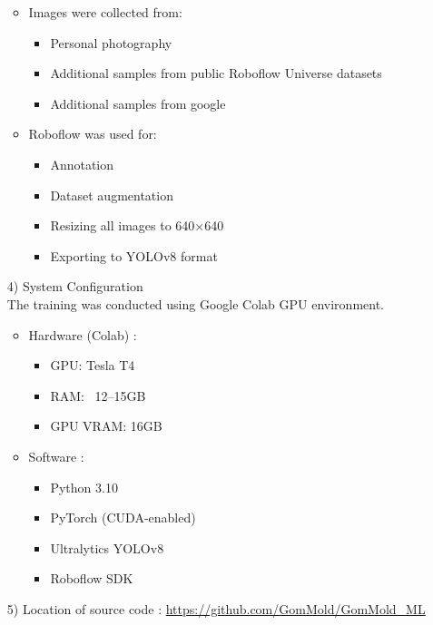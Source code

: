 \documentclass[conference]{IEEEtran}
\begin{document}
\begin{enumerate}
\begin{itemize}
        \item Images were collected from:
            \begin{itemize}
                \item Personal photography
                \item Additional samples from public Roboflow Universe datasets
                \item Additional samples from google 
            \end{itemize} 
            
         \item Roboflow was used for:
            \begin{itemize}
                \item Annotation
                \item Dataset augmentation
                \item Resizing all images to 640×640
                \item Exporting to YOLOv8 format\\
            \end{itemize} 
    \end{itemize}
    
\item[4)] System Configuration\\ 
\noindent The training was conducted using Google Colab GPU environment.
    \begin{itemize}
        \item Hardware (Colab) :
            \begin{itemize}
                \item GPU: Tesla T4 
                \item RAM: ~12–15GB
                \item GPU VRAM: 16GB
            \end{itemize}
            
        \item Software :
            \begin{itemize}
                \item Python 3.10
                \item PyTorch (CUDA-enabled)
                \item Ultralytics YOLOv8
                \item Roboflow SDK\\
            \end{itemize} 
    \end{itemize}

\item[5)]Location of source code : \url{https://github.com/GomMold/GomMold_ML}\\
 
\end{enumerate}
\end{document}
